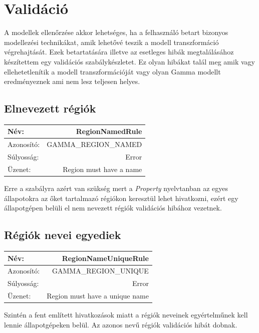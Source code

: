 \newpage
\section{Validáció}

A modellek ellenőrzése akkor lehetséges, ha a felhasználó betart bizonyos modellezési technikákat, amik lehetővé teszik a modell transzformáció végrehajtását. Ezek betartatására illetve az esetleges hibák megtalálásához készítettem egy validációs szabálykészletet. Ez olyan hibákat talál meg amik vagy ellehetetlenítik a modell transzformációját vagy olyan Gamma modellt eredményeznek ami nem lesz teljesen helyes.

\subsection{Elnevezett régiók}

\begin{tabular}{ | l | r | }
	\hline
	Név: & RegionNamedRule  \\ 
	\hline
	Azonosító: & GAMMA\_REGION\_NAMED \\
	\hline
	Súlyosság: & Error \\  
	\hline
	Üzenet: & Region must have a name \\
	\hline
\end{tabular}\newline
\newline
Erre a szabályra azért van szükség mert a \emph{Property} nyelvtanban az egyes állapotokra az őket tartalmazó régiókon keresztül lehet hivatkozni, ezért egy állapotgépen belüli el nem nevezett régiók validációs hibához vezetnek.

\subsection{Régiók nevei egyediek}

\begin{tabular}{ | l | r | }
	\hline
	Név: & RegionNameUniqueRule  \\ 
	\hline
	Azonosító: & GAMMA\_REGION\_UNIQUE \\
	\hline
	Súlyosság: & Error \\  
	\hline
	Üzenet: & Region must have a unique name \\
	\hline
\end{tabular}\newline
\newline
Szintén a fent említett hivatkozások miatt a régiók neveinek egyértelműnek kell lennie állapotgépeken belül. Az azonos nevű régiók validációs hibát dobnak.

